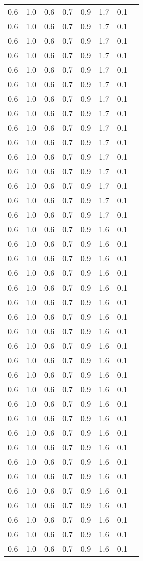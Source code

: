 \begin{tabular}{L{1in}|L{1in}|L{1in}|L{1in}|L{1in}|L{1in}|L{1in}|L{1in}}
0.6&1.0&0.6&0.7&0.9&1.7&0.1\\
0.6&1.0&0.6&0.7&0.9&1.7&0.1\\
0.6&1.0&0.6&0.7&0.9&1.7&0.1\\
0.6&1.0&0.6&0.7&0.9&1.7&0.1\\
0.6&1.0&0.6&0.7&0.9&1.7&0.1\\
0.6&1.0&0.6&0.7&0.9&1.7&0.1\\
0.6&1.0&0.6&0.7&0.9&1.7&0.1\\
0.6&1.0&0.6&0.7&0.9&1.7&0.1\\
0.6&1.0&0.6&0.7&0.9&1.7&0.1\\
0.6&1.0&0.6&0.7&0.9&1.7&0.1\\
0.6&1.0&0.6&0.7&0.9&1.7&0.1\\
0.6&1.0&0.6&0.7&0.9&1.7&0.1\\
0.6&1.0&0.6&0.7&0.9&1.7&0.1\\
0.6&1.0&0.6&0.7&0.9&1.7&0.1\\
0.6&1.0&0.6&0.7&0.9&1.7&0.1\\
0.6&1.0&0.6&0.7&0.9&1.6&0.1\\
0.6&1.0&0.6&0.7&0.9&1.6&0.1\\
0.6&1.0&0.6&0.7&0.9&1.6&0.1\\
0.6&1.0&0.6&0.7&0.9&1.6&0.1\\
0.6&1.0&0.6&0.7&0.9&1.6&0.1\\
0.6&1.0&0.6&0.7&0.9&1.6&0.1\\
0.6&1.0&0.6&0.7&0.9&1.6&0.1\\
0.6&1.0&0.6&0.7&0.9&1.6&0.1\\
0.6&1.0&0.6&0.7&0.9&1.6&0.1\\
0.6&1.0&0.6&0.7&0.9&1.6&0.1\\
0.6&1.0&0.6&0.7&0.9&1.6&0.1\\
0.6&1.0&0.6&0.7&0.9&1.6&0.1\\
0.6&1.0&0.6&0.7&0.9&1.6&0.1\\
0.6&1.0&0.6&0.7&0.9&1.6&0.1\\
0.6&1.0&0.6&0.7&0.9&1.6&0.1\\
0.6&1.0&0.6&0.7&0.9&1.6&0.1\\
0.6&1.0&0.6&0.7&0.9&1.6&0.1\\
0.6&1.0&0.6&0.7&0.9&1.6&0.1\\
0.6&1.0&0.6&0.7&0.9&1.6&0.1\\
0.6&1.0&0.6&0.7&0.9&1.6&0.1\\
0.6&1.0&0.6&0.7&0.9&1.6&0.1\\
0.6&1.0&0.6&0.7&0.9&1.6&0.1\\
0.6&1.0&0.6&0.7&0.9&1.6&0.1\\

\end{tabular}

